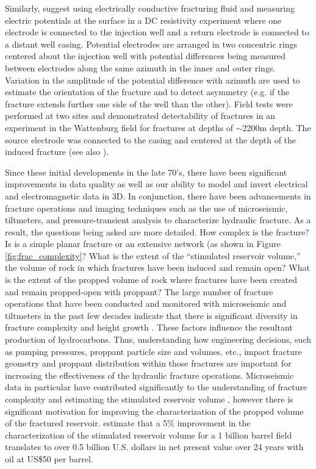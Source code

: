 Similarly, \cite{Bartel1976} suggest using electrically conductive fracturing fluid and measuring electric potentials at the surface in a DC resistivity experiment where one electrode is connected to the injection well and a return electrode is connected to a distant well casing. Potential electrodes are arranged in two concentric rings centered about the injection well with potential differences being measured between electrodes along the same azimuth in the inner and outer rings. Variation in the amplitude of the potential difference with azimuth are used to estimate the orientation of the fracture and to detect asymmetry (e.g. if the fracture extends further one side of the well than the other). Field tests were performed at two sites and demonstrated detectability of fractures in an experiment in the Wattenburg field for fractures at depths of $\sim$2200m depth. The source electrode was connected to the casing and centered at the depth of the induced fracture (see also \cite{Smith1978}).

Since these initial developments in the late 70's, there have been significant improvements in data quality as well as our ability to model and invert electrical and electromagnetic data in 3D. In conjunction, there have been advancements in fracture operations and imaging techniques such as the use of microseismic, tiltmeters, and pressure-transient analysis to characterize hydraulic fracture. As a result, the questions being asked are more detailed. How complex is the fracture? Is is a simple planar fracture or an extensive network (as shown in Figure \ref{fig:frac_complexity}? What is the extent of the ``stimulated reservoir volume,'' the volume of rock in which fractures have been induced and remain open? What is the extent of the propped volume of rock where fractures have been created and remain propped-open with proppant? The large number of fracture operations that have been conducted and monitored with microseismic and tiltmeters in the past few decades indicate that there is significant diversity in fracture complexity and height growth \cite{Cipolla2008}. These factors influence the resultant production of hydrocarbons. Thus, understanding how engineering decisions, such as pumping pressures, proppant particle size and volumes, etc., impact fracture geometry and proppant distribution within those fractures are important for increasing the effectiveness of the hydraulic fracture operations. Microseismic data in particular have contributed significantly to the understanding of fracture complexity and estimating the stimulated reservoir volume \citep{Mayerhofer2010}, however there is significant motivation for improving the characterization of the propped volume of the fractured reservoir. \cite{Hoversten2015} estimate that a 5\% improvement in the characterization of the stimulated reservoir volume for a 1 billion barrel field translates to over 0.5 billion U.S. dollars in net present value over 24 years with oil at US\$50 per barrel.


